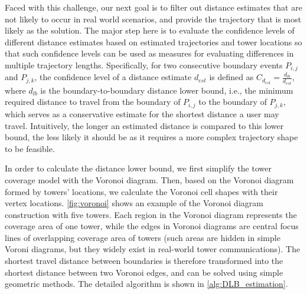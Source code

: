 Faced with this challenge, our next goal is to filter out distance estimates that are not likely to occur in real world scenarios, and provide the trajectory that is most likely as the solution. The major step here is to evaluate the confidence levels of different distance estimates based on estimated trajectories and tower locations so that such confidence levels can be used as measures for evaluating differences in multiple trajectory lengths. Specifically, for two consecutive boundary events $P_{i,j}$ and $P_{j,k}$, the confidence level of a distance estimate $d_{est}$ is defined as $C_{d_{est}} = \frac{d_{lb}}{d_{est}}$, where $d_{lb}$ is the boundary-to-boundary distance lower bound, i.e., the minimum required distance to travel from the boundary of $P_{i,j}$ to the boundary of $P_{j,k}$, which serves as a conservative estimate for the shortest distance a user may travel. Intuitively, the longer an estimated distance is compared to this lower bound, the less likely it should be as it requires a more complex trajectory shape to be feasible.


In order to calculate the distance lower bound, 
we first simplify the tower coverage model with the Voronoi diagram. 
Then, based on the Voronoi diagram formed by towers' locations, we calculate the Voronoi cell shapes with their vertex locations. 
\autoref{fig:voronoi} shows an example of the Voronoi diagram construction with five towers. 
Each region in the Voronoi diagram represents the coverage area of one tower, while the edges in Voronoi diagrams are central focus lines of overlapping coverage area of towers (such areas are hidden in simple Voroni diagrams, but they widely exist in real-world tower communications).  
The shortest travel distance between boundaries is therefore transformed into the shortest distance between two Voronoi edges, 
and can be solved using simple geometric methods. The detailed algorithm is shown in \autoref{alg:DLB_estimation}.

